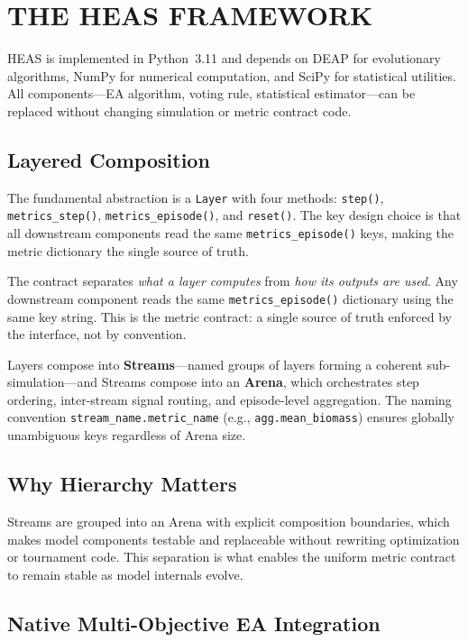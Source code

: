 \documentclass{wscpaperproc}
\begin{document}
\section{THE HEAS FRAMEWORK}

HEAS is implemented in Python~3.11 and depends on DEAP for evolutionary
algorithms, NumPy for numerical computation, and SciPy for statistical
utilities. All components---EA algorithm, voting rule, statistical
estimator---can be replaced without changing simulation or metric contract code.

\subsection{Layered Composition}

The fundamental abstraction is a \texttt{Layer} with four methods:
\texttt{step()}, \texttt{metrics\_step()}, \texttt{metrics\_episode()}, and
\texttt{reset()}. The key design choice is that all downstream components read
the same \texttt{metrics\_episode()} keys, making the metric dictionary the
single source of truth.

The contract separates \emph{what a layer computes} from \emph{how its outputs
are used}. Any downstream component reads the same \texttt{metrics\_episode()}
dictionary using the same key string. This is the metric contract: a single
source of truth enforced by the interface, not by convention.

Layers compose into \textbf{Streams}---named groups of layers forming a
coherent sub-simulation---and Streams compose into an \textbf{Arena}, which
orchestrates step ordering, inter-stream signal routing, and episode-level
aggregation. The naming convention \texttt{stream\_name.metric\_name}
(e.g., \texttt{agg.mean\_biomass}) ensures globally unambiguous keys regardless
of Arena size.

\subsection{Why Hierarchy Matters}

Streams are grouped into an Arena with explicit composition boundaries, which
makes model components testable and replaceable without rewriting optimization
or tournament code. This separation is what enables the uniform metric contract
to remain stable as model internals evolve.

\subsection{Native Multi-Objective EA Integration}
\end{document}
